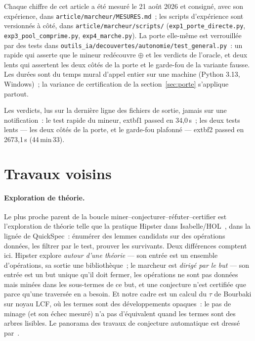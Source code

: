 \documentclass[11pt]{article}
\theoremstyle{remark}\newtheorem{remarque}{Remarque}
\begin{document}
Chaque chiffre de cet article a été mesuré le 21 août 2026 et consigné, avec
son expérience, dans \texttt{article/marcheur/MESURES.md}~; les scripts
d'expérience sont versionnés à côté, dans \texttt{article/marcheur/scripts/}
(\texttt{exp1\_porte\_directe.py}, \texttt{exp3\_pool\_comprime.py},
\texttt{exp4\_marche.py}). La porte elle-même est verrouillée par des tests
dans \texttt{outils\_ia/decouvertes/autonomie/test\_general.py}~: un rapide
qui asserte que le mineur redécouvre $\oplus$ et les verdicts de l'oracle, et
deux lents qui assertent les deux côtés de la porte et le garde-fou de la
variante fausse. Les durées sont du temps mural d'appel entier sur une
machine (Python 3.13, Windows)~; la variance de certification de la
section~\ref{sec:porte} s'applique partout.

Les verdicts, lus sur la dernière ligne des fichiers de sortie, jamais sur
une notification~: le test rapide du mineur, 	extbf{1 passed en 34,0\,s}~;
les deux tests lents --- les deux côtés de la porte, et le garde-fou
plafonné --- 	extbf{2 passed en 2673,1\,s} (44\,min\,33).

\section{Travaux voisins}
\label{sec:related}

\paragraph{Exploration de théorie.} Le plus proche parent de la boucle
miner--conjecturer--réfuter--certifier est l'exploration de théorie telle que
la pratique Hipster dans Isabelle/HOL~\cite{johansson2014hipster}, dans la
lignée de QuickSpec~: énumérer des lemmes candidats sur des opérations
données, les filtrer par le test, prouver les survivants. Deux différences
comptent ici. Hipster explore \emph{autour d'une théorie} --- son entrée est
un ensemble d'opérations, sa sortie une bibliothèque~; le marcheur est
\emph{dirigé par le but} --- son entrée est un but unique qu'il doit fermer,
les opérations ne sont pas données mais minées dans les sous-termes de ce
but, et une conjecture n'est certifiée que parce qu'une traversée en a
besoin. Et notre cadre est un calcul du $\tau$ de Bourbaki sur noyau LCF, où
les termes sont des développements opaques~: le pas de minage (et son échec
mesuré) n'a pas d'équivalent quand les termes sont des arbres lisibles. Le
panorama des travaux de conjecture automatique est dressé
par~\cite{conjecturingsurvey2026}.
\end{document}
